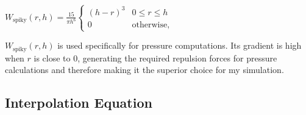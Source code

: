 \documentclass[write-up.tex]{subfiles}
\begin{document}
\begin{center}
$
    W_{\text{spiky}}(r, h) = \displaystyle \frac{15}{\pi h^6}
    \begin{cases}
        (h-r)^3 & 0 \leq r \leq h \\
        0 & \text{otherwise},
    \end{cases}
$
\end{center}


$W_{\text{spiky}}(r, h)$ is used specifically for pressure computations. Its gradient is high when $r$ is close to $0$, generating the required repulsion forces for pressure calculations and therefore making it the superior choice for my simulation.

\subsection{Interpolation Equation}
\end{document}

